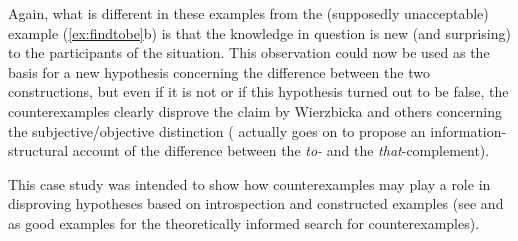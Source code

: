 Again, what is different in these examples from the (supposedly unacceptable) example (\ref{ex:findtobe}b) is that the knowledge in question is new (and surprising) to the participants of the situation. This observation could now be used as the basis for a new hypothesis concerning the difference between the two constructions, but even if it is not or if this hypothesis turned out to be false, the counterexamples clearly disprove the claim by Wierzbicka and others concerning the subjective/objective distinction (\citet{rohdenburg_is_2003} actually goes on to propose an information-structural account of the difference between the \textit{to-} and the \textit{that}-complement).

This case study was intended to show how counterexamples may play a role in disproving hypotheses based on introspection and constructed examples (see \citet{meurers_use_2005} and \citet{meurers_corpora_2009} as good examples for the theoretically informed search for counterexamples).

